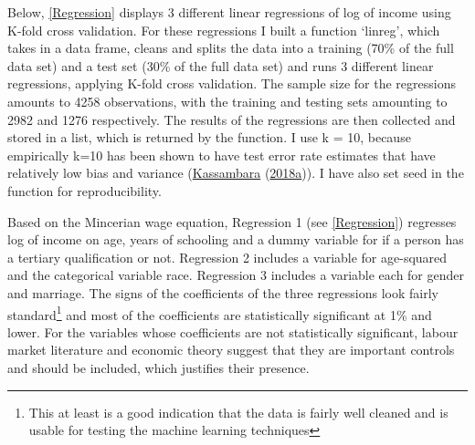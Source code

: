 \documentclass[11pt,preprint, authoryear]{elsarticle}
\numberwithin{equation}{section}
\numberwithin{figure}{section}
\numberwithin{table}{section}
\let\rmarkdownfootnote\footnote%
\def\footnote{\protect\rmarkdownfootnote}
\begin{document}
Below, \ref{Regression} displays 3 different linear regressions of log
of income using K-fold cross validation. For these regressions I built a
function `linreg', which takes in a data frame, cleans and splits the
data into a training (70\% of the full data set) and a test set (30\% of
the full data set) and runs 3 different linear regressions, applying
K-fold cross validation. The sample size for the regressions amounts to
4258 observations, with the training and testing sets amounting to 2982
and 1276 respectively. The results of the regressions are then collected
and stored in a list, which is returned by the function. I use k = 10,
because empirically k=10 has been shown to have test error rate
estimates that have relatively low bias and variance
(\protect\hyperlink{ref-k}{Kassambara}
(\protect\hyperlink{ref-k}{2018a})). I have also set seed in the
function for reproducibility.

Based on the Mincerian wage equation, Regression 1 (see
\ref{Regression}) regresses log of income on age, years of schooling and
a dummy variable for if a person has a tertiary qualification or not.
Regression 2 includes a variable for age-squared and the categorical
variable race. Regression 3 includes a variable each for gender and
marriage. The signs of the coefficients of the three regressions look
fairly standard\footnote{This at least is a good indication that the
  data is fairly well cleaned and is usable for testing the machine
  learning techniques} and most of the coefficients are statistically
significant at 1\% and lower. For the variables whose coefficients are
not statistically significant, labour market literature and economic
theory suggest that they are important controls and should be included,
which justifies their presence.

 
  \providecommand{\huxb}[2]{\arrayrulecolor[RGB]{#1}\global\arrayrulewidth=#2pt}
  \providecommand{\huxvb}[2]{\color[RGB]{#1}\vrule width #2pt}
  \providecommand{\huxtpad}[1]{\rule{0pt}{#1}}
  \providecommand{\huxbpad}[1]{\rule[-#1]{0pt}{#1}}
\end{document}
